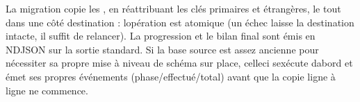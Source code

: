 \documentclass[letterpaper,10pt,dvipdfmx]{sphinxmanual}
\begin{document}
\sphinxAtStartPar
La migration copie les , en réattribuant les clés primaires et étrangères, le
tout dans une  côté destination : l\textquotesingle{}opération est atomique
(un échec laisse la destination intacte, il suffit de relancer). La progression
et le bilan final sont émis en NDJSON sur la sortie standard. Si la base source
est assez ancienne pour nécessiter sa propre mise à niveau de schéma sur place,
celle\sphinxhyphen{}ci s\textquotesingle{}exécute d\textquotesingle{}abord et émet ses propres événements
 (phase/effectué/total) avant que la copie ligne à ligne
ne commence.
\end{document}
